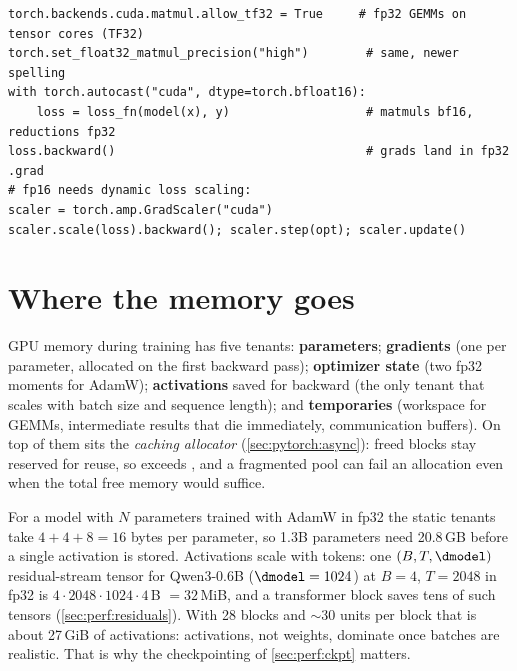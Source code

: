 \begin{lstlisting}[caption={Precision switches worth knowing.},label={lst:perf:ampknobs}]
torch.backends.cuda.matmul.allow_tf32 = True     # fp32 GEMMs on tensor cores (TF32)
torch.set_float32_matmul_precision("high")        # same, newer spelling
with torch.autocast("cuda", dtype=torch.bfloat16):
    loss = loss_fn(model(x), y)                   # matmuls bf16, reductions fp32
loss.backward()                                   # grads land in fp32 .grad
# fp16 needs dynamic loss scaling:
scaler = torch.amp.GradScaler("cuda")
scaler.scale(loss).backward(); scaler.step(opt); scaler.update()
\end{lstlisting}

\section{Where the memory goes}\label{sec:perf:memory}

GPU memory during training has five tenants: \textbf{parameters}; \textbf{gradients} (one per
parameter, allocated on the first backward pass); \textbf{optimizer state} (two fp32 moments for
AdamW); \textbf{activations} saved for backward (the only tenant that scales with batch size and
sequence length); and \textbf{temporaries} (workspace for GEMMs, intermediate results that die
immediately, communication buffers). On top of them sits the \emph{caching allocator}
(\cref{sec:pytorch:async}): freed blocks stay reserved for reuse, so
 exceeds , and a fragmented pool can
fail an allocation even when the total free memory would suffice.

\begin{napkinmath}
For a model with $N$ parameters trained with AdamW in fp32 the static tenants take
$4+4+8=16$ bytes per parameter, so 1.3B parameters need 20.8\,GB before a single activation is
stored. Activations scale with tokens: one $(B,T,\dmodel)$ residual-stream tensor for Qwen3-0.6B
($\dmodel=1024$) at $B=4$, $T=2048$ in fp32 is $4\cdot2048\cdot1024\cdot4$\,B $=32$\,MiB, and a
transformer block saves tens of such tensors (\cref{sec:perf:residuals}). With 28 blocks and
$\sim$30 units per block that is about 27\,GiB of activations: activations, not weights, dominate
once batches are realistic. That is why the checkpointing of \cref{sec:perf:ckpt} matters.
\end{napkinmath}


